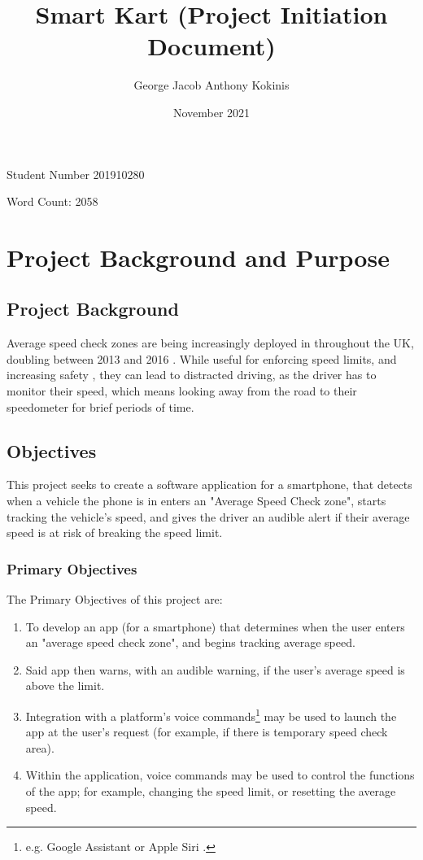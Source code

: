 \documentclass[11pt, a4paper, notitlepage]{report}
\title{Smart Kart (Project Initiation Document)}
\date{November 2021}
\author{George Jacob Anthony Kokinis}
\newcounter{objectivesCounter}
\begin{document}
\maketitle
\begin{center}
    Student Number 201910280
    
    Word Count: 2058 %
\end{center}
\newpage

\tableofcontents

\chapter{Project Background and Purpose}
\section {Project Background}
Average speed check zones \citep{specsjenop} are being increasingly deployed in throughout the UK, doubling between 2013 and 2016 \citep{BBCSpeedCameraDoubled}. While useful for enforcing speed limits, and increasing safety \citep{owenAllsop}, they can lead to distracted driving, as the driver has to monitor their speed, which means looking away from the road to their speedometer for brief periods of time.

\section{Objectives}
This project seeks to create a software application for a smartphone, that 
detects when a vehicle the phone is in enters an "Average Speed Check zone", 
starts tracking the vehicle's speed, and gives the driver an audible alert if 
their average speed is at risk of breaking the speed limit.

\subsection{Primary Objectives}\label{subsec:PrimaryObjectives}
The Primary Objectives of this project are:
\begin{enumerate}
    \item To develop an app (for a smartphone) that determines when the user enters an "average speed check zone", and begins tracking average speed.
    \item Said app then warns, with an audible warning, if the user's average 
    speed is above the limit.
    \item Integration with a platform's voice commands\footnote{e.g. Google Assistant \citep{GoogleAssistant} or Apple Siri \citep{AppleSiri}.} may be used to launch the app at the user's request (for example, if there is temporary speed check area).
    \item Within the application, voice commands may be used to control the functions of the app; for example, changing the speed limit, or resetting the average speed.
    \setcounter{objectivesCounter}{\value{enumi}}
\end{enumerate}
\end{document}
